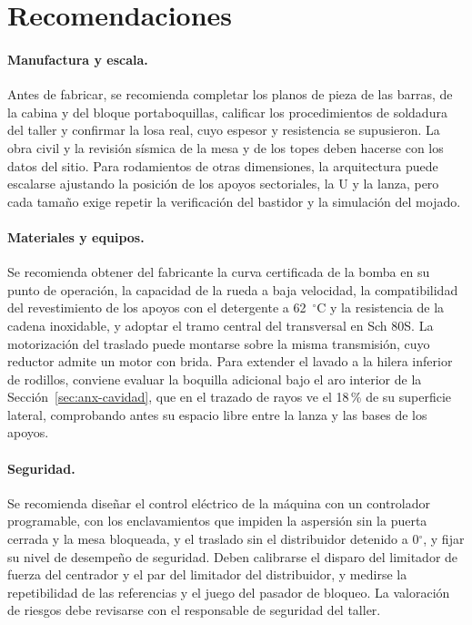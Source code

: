 \section{Recomendaciones}

\paragraph{Manufactura y escala.} Antes de fabricar, se recomienda completar los planos de pieza de las barras, de la cabina y del bloque portaboquillas, calificar los procedimientos de soldadura del taller y confirmar la losa real, cuyo espesor y resistencia se supusieron. La obra civil y la revisión sísmica de la mesa y de los topes deben hacerse con los datos del sitio. Para rodamientos de otras dimensiones, la arquitectura puede escalarse ajustando la posición de los apoyos sectoriales, la U y la lanza, pero cada tamaño exige repetir la verificación del bastidor y la simulación del mojado.

\paragraph{Materiales y equipos.} Se recomienda obtener del fabricante la curva certificada de la bomba en su punto de operación, la capacidad de la rueda a baja velocidad, la compatibilidad del revestimiento de los apoyos con el detergente a 62~$^\circ$C y la resistencia de la cadena inoxidable, y adoptar el tramo central del transversal en Sch 80S. La motorización del traslado puede montarse sobre la misma transmisión, cuyo reductor admite un motor con brida. Para extender el lavado a la hilera inferior de rodillos, conviene evaluar la boquilla adicional bajo el aro interior de la Sección~\ref{sec:anx-cavidad}, que en el trazado de rayos ve el 18\,\% de su superficie lateral, comprobando antes su espacio libre entre la lanza y las bases de los apoyos.

\paragraph{Seguridad.} Se recomienda diseñar el control eléctrico de la máquina con un controlador programable, con los enclavamientos que impiden la aspersión sin la puerta cerrada y la mesa bloqueada, y el traslado sin el distribuidor detenido a 0$^\circ$, y fijar su nivel de desempeño de seguridad. Deben calibrarse el disparo del limitador de fuerza del centrador y el par del limitador del distribuidor, y medirse la repetibilidad de las referencias y el juego del pasador de bloqueo. La valoración de riesgos debe revisarse con el responsable de seguridad del taller.

